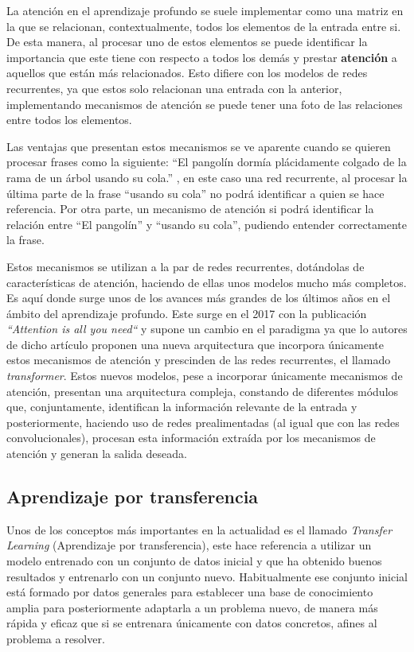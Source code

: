 La atención en el aprendizaje profundo se suele implementar como una matriz en
la que se relacionan, contextualmente, todos los elementos de la entrada entre
si. De esta manera, al procesar uno de estos elementos se puede identificar la
importancia que este tiene con respecto a todos los demás y prestar
\textbf{atención} a aquellos que están más relacionados. Esto difiere con los
modelos de redes recurrentes, ya que estos solo relacionan una entrada con la
anterior, implementando mecanismos de atención se puede tener una foto de las
relaciones entre todos los elementos.

Las ventajas que presentan estos mecanismos se ve aparente cuando se quieren
procesar frases como la siguiente: ``El pangolín dormía plácidamente colgado de
la rama de un árbol usando su cola.'' \cite{DotcsvAtencion}, en este caso una red recurrente, al
procesar la última parte de la frase ``usando su cola'' no podrá identificar a
quien se hace referencia. Por otra parte, un mecanismo de atención si podrá
identificar la relación entre ``El pangolín'' y ``usando su cola'', pudiendo
entender correctamente la frase. 

Estos mecanismos se utilizan a la par de redes recurrentes, dotándolas de
características de atención, haciendo de ellas unos modelos mucho más completos.
Es aquí donde surge unos de los avances más grandes de los últimos años en el
ámbito del aprendizaje profundo. Este surge en el 2017 con la publicación
\textit{``Attention is all you need``} \cite{vaswani2017attention} y supone un cambio en el paradigma
ya que lo autores de dicho artículo proponen una nueva arquitectura que
incorpora únicamente estos mecanismos de atención y prescinden de las redes
recurrentes, el llamado \textit{transformer}. Estos nuevos modelos, pese a
incorporar únicamente mecanismos de atención, presentan una arquitectura
compleja, constando de diferentes módulos que, conjuntamente, identifican la
información relevante de la entrada y posteriormente, haciendo uso de redes prealimentadas (al igual que con las redes convolucionales), procesan esta información
extraída por los mecanismos de atención y generan la salida deseada.


\subsection{Aprendizaje por transferencia}
Unos de los conceptos más importantes en la actualidad es el llamado
\textit{Transfer Learning} (Aprendizaje por transferencia), este hace referencia
a utilizar un modelo entrenado con un conjunto de datos inicial y que ha
obtenido buenos resultados y entrenarlo con un conjunto nuevo. Habitualmente ese
conjunto inicial está formado por datos generales para establecer una base de
conocimiento amplia para posteriormente adaptarla a un problema nuevo, de manera
más rápida y eficaz que si se entrenara únicamente con datos concretos, afines
al problema a resolver. 

